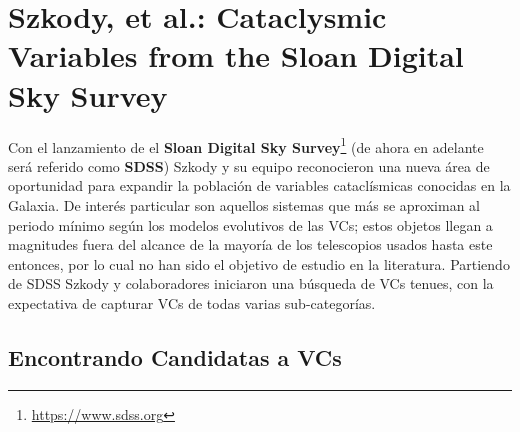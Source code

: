 \section{Szkody, et al.: Cataclysmic Variables from the Sloan Digital Sky Survey}

Con el lanzamiento de el \textbf{Sloan Digital Sky Survey}\footnote{\url{https://www.sdss.org}} (de ahora en adelante será referido como \textbf{SDSS}) Szkody y su equipo reconocieron una nueva área de oportunidad para expandir la población de variables cataclísmicas conocidas en la Galaxia. De interés particular son aquellos sistemas que más se aproximan al periodo mínimo según los modelos evolutivos de las VCs; estos objetos llegan a magnitudes fuera del alcance de la mayoría de los telescopios usados hasta este entonces, por lo cual no han sido el objetivo de estudio en la literatura. Partiendo de SDSS Szkody y colaboradores iniciaron una búsqueda de VCs tenues, con la expectativa de capturar VCs de todas varias sub-categorías.

\subsection{Encontrando Candidatas a VCs}


